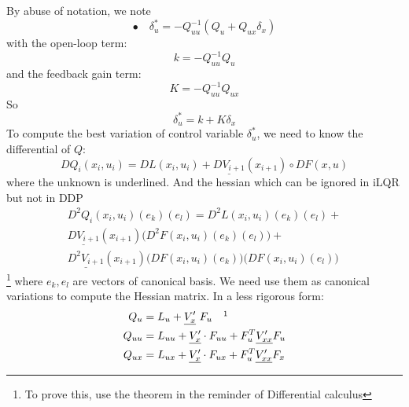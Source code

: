 \documentclass{report}
\begin{document}
By abuse of notation, we note
\begin{equation}
\bullet \quad \delta_u^* = - Q_{uu}^{-1} (Q_u + Q_{ux} \delta_x)
\end{equation}
with the open-loop term:
\begin{equation}
k = - Q_{uu}^{-1} Q_u
\end{equation}
and the feedback gain term:
\begin{equation}
K = - Q_{uu}^{-1} Q_{ux}
\end{equation}
So
\begin{equation}
 \delta_u^* = k + K \delta_x
\end{equation}
To compute the best variation of control variable $\delta_u^*$, we need to know the differential of $Q$:
\begin{equation}
    D Q_i (x_i, u_i) = DL(x_i,u_i) + \underline{DV_{i+1}}(x_{i+1}) \circ DF(x,u)
\end{equation}
where the unknown is underlined. 
And the hessian which can be ignored in iLQR but not in DDP 
\cite{TassaIROS12}
\begin{multline}
     D^2 Q_i (x_i ,u_i) (e_k) (e_l) = D^2 L (x_i ,u_i) (e_k) (e_l) + \\
        \underline{DV_{i+1}}(x_{i+1})\big(D^2 F (x_i ,u_i) (e_k) (e_l)\big) +\\
        \underline{D^2 V_{i+1}}(x_{i+1}) \big( DF(x_i ,u_i)(e_k) \big) \big( DF(x_i ,u_i)(e_l) \big)
\end{multline}
\footnote{To prove this, use the theorem in the reminder of Differential calculus}
where $e_k, e_l$ are vectors of canonical basis. We need use them as canonical variations to compute the Hessian matrix. In a less rigorous form:
\begin{equation}
\label{QfromV}
\begin{split}
Q_u & = L_u + \underline{V'_x}   \ F_u \quad \footnotemark \\
Q_{uu} &= L_{uu} + \underline{V'_x} \cdot F_{uu} + F_u^T \underline{V'_{xx}} F_u \\
Q_{ux} &= L_{ux} + \underline{V'_x} \cdot F_{ux} + F_u^T \underline{V'_{xx}} F_x
\end{split}
\end{equation}
\end{document}

